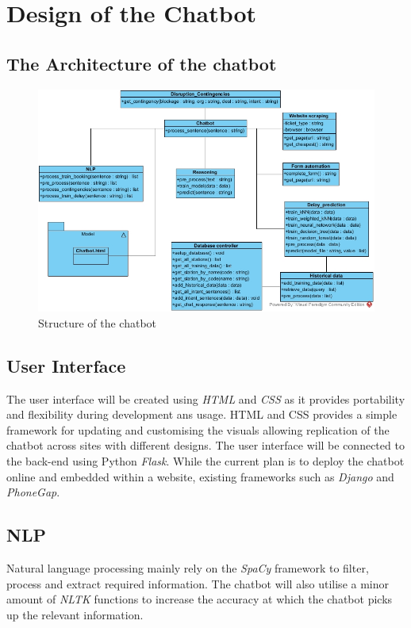 \documentclass[11pt]{article}
\begin{document}
\section{Design of the Chatbot}

 
\subsection{The Architecture of the chatbot}
\begin{figure}[!htb]
	\centering
	\includegraphics[width=1.0\textwidth]{Chatbot_Structure}
	\caption{Structure of the chatbot }\label{fig:Chatbot_Structure}
\end{figure}
\subsection{User Interface} 
The user interface will be created using \textit{HTML} and \textit{CSS} as it provides portability and flexibility during development ans usage. HTML and CSS provides a simple framework for updating and customising the visuals allowing replication of the chatbot across sites with different designs. The user interface will be connected to the back-end using Python \textit{Flask}. While the current plan is to deploy the chatbot online and embedded within a website, existing frameworks such as \textit{Django} and \textit{PhoneGap}.

\subsection{NLP}
Natural language processing mainly rely on the \textit{SpaCy} framework to filter, process and extract required information. The chatbot will also utilise a minor amount of \textit{NLTK} functions to increase the accuracy at which the chatbot picks up the relevant information.
\end{document}
